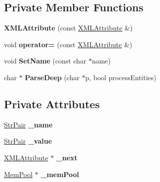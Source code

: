 \subsection*{Private Member Functions}
\begin{DoxyCompactItemize}
\item 
{\bfseries X\+M\+L\+Attribute} (const \hyperlink{classtinyxml2_1_1_x_m_l_attribute}{X\+M\+L\+Attribute} \&)\hypertarget{classtinyxml2_1_1_x_m_l_attribute_a423410d8fb1b94f4514e34abf5432457}{}\label{classtinyxml2_1_1_x_m_l_attribute_a423410d8fb1b94f4514e34abf5432457}

\item 
void {\bfseries operator=} (const \hyperlink{classtinyxml2_1_1_x_m_l_attribute}{X\+M\+L\+Attribute} \&)\hypertarget{classtinyxml2_1_1_x_m_l_attribute_a38e1d174a975bab27a70b4032e39a257}{}\label{classtinyxml2_1_1_x_m_l_attribute_a38e1d174a975bab27a70b4032e39a257}

\item 
void {\bfseries Set\+Name} (const char $\ast$name)\hypertarget{classtinyxml2_1_1_x_m_l_attribute_a469c2363600007f49e62a8048a362d57}{}\label{classtinyxml2_1_1_x_m_l_attribute_a469c2363600007f49e62a8048a362d57}

\item 
char $\ast$ {\bfseries Parse\+Deep} (char $\ast$p, bool process\+Entities)\hypertarget{classtinyxml2_1_1_x_m_l_attribute_a44ffae60efcd2c97960f11bb5e3f9a32}{}\label{classtinyxml2_1_1_x_m_l_attribute_a44ffae60efcd2c97960f11bb5e3f9a32}

\end{DoxyCompactItemize}
\subsection*{Private Attributes}
\begin{DoxyCompactItemize}
\item 
\hyperlink{classtinyxml2_1_1_str_pair}{Str\+Pair} {\bfseries \+\_\+name}\hypertarget{classtinyxml2_1_1_x_m_l_attribute_a80850208963b536e9254a7fa1d4abe67}{}\label{classtinyxml2_1_1_x_m_l_attribute_a80850208963b536e9254a7fa1d4abe67}

\item 
\hyperlink{classtinyxml2_1_1_str_pair}{Str\+Pair} {\bfseries \+\_\+value}\hypertarget{classtinyxml2_1_1_x_m_l_attribute_abcf5c9b7f040ed71ed2a66557584b5b0}{}\label{classtinyxml2_1_1_x_m_l_attribute_abcf5c9b7f040ed71ed2a66557584b5b0}

\item 
\hyperlink{classtinyxml2_1_1_x_m_l_attribute}{X\+M\+L\+Attribute} $\ast$ {\bfseries \+\_\+next}\hypertarget{classtinyxml2_1_1_x_m_l_attribute_a3bbf00f77131a8e83d648d32d090c564}{}\label{classtinyxml2_1_1_x_m_l_attribute_a3bbf00f77131a8e83d648d32d090c564}

\item 
\hyperlink{classtinyxml2_1_1_mem_pool}{Mem\+Pool} $\ast$ {\bfseries \+\_\+mem\+Pool}\hypertarget{classtinyxml2_1_1_x_m_l_attribute_ac0a1130568dd9e985dd7753ae44fcdbf}{}\label{classtinyxml2_1_1_x_m_l_attribute_ac0a1130568dd9e985dd7753ae44fcdbf}

\end{DoxyCompactItemize}
